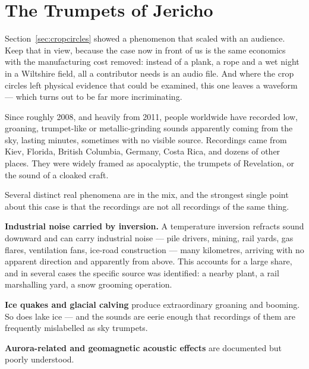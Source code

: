 
\section{The Trumpets of Jericho}\label{sec:trumpetsjericho}

Section~\ref{sec:cropcircles} showed a phenomenon that scaled with an audience. Keep that in view,
because the case now in front of us is the same economics with the manufacturing cost removed:
instead of a plank, a rope and a wet night in a Wiltshire field, all a contributor needs is an
audio file. And where the crop circles left physical evidence that could be examined, this one
leaves a waveform --- which turns out to be far more incriminating.

Since roughly 2008, and heavily from 2011, people worldwide have recorded low, groaning,
trumpet-like or metallic-grinding sounds apparently coming from the sky, lasting minutes,
sometimes with no visible source. Recordings came from Kiev, Florida, British Columbia, Germany,
Costa Rica, and dozens of other places. They were widely framed as apocalyptic, the trumpets of
Revelation, or the sound of a cloaked craft.

Several distinct real phenomena are in the mix, and the strongest single point about this case is
that the recordings are not all recordings of the same thing.

\textbf{Industrial noise carried by inversion.} A temperature inversion refracts sound downward
and can carry industrial noise --- pile drivers, mining, rail yards, gas flares, ventilation
fans, ice-road construction --- many kilometres, arriving with no apparent direction and
apparently from above. This accounts for a large share, and in several cases the specific source
was identified: a nearby plant, a rail marshalling yard, a snow grooming operation.

\textbf{Ice quakes and glacial calving} produce extraordinary groaning and booming. So does lake
ice --- and the sounds are eerie enough that recordings of them are frequently mislabelled as
sky trumpets.

\textbf{Aurora-related and geomagnetic acoustic effects} are documented but poorly understood.

